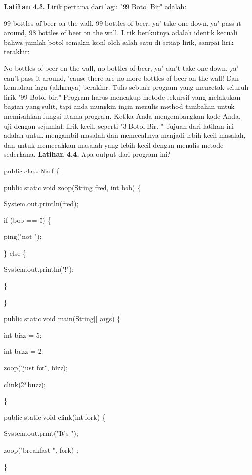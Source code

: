 \textbf{Latihan 4.3.} Lirik pertama dari lagu "99 Botol Bir" adalah:
\newline
\par
99 bottles of beer on the wall, 99 bottles of beer, ya’ take one
down, ya’ pass it around, 98 bottles of beer on the wall.
\newline
\newline
Lirik berikutnya adalah identik kecuali bahwa jumlah botol semakin kecil oleh salah satu di setiap lirik, sampai lirik terakhir:
\newline
\par
No bottles of beer on the wall, no bottles of beer, ya’ can’t take one down, ya’ can’t pass it around, ’cause there are no more
bottles of beer on the wall!
\newline
\newline
Dan kemudian lagu (akhirnya) berakhir.
\newline
\newline
Tulis sebuah program yang mencetak seluruh lirik "99 Botol bir." Program harus mencakup metode rekursif yang melakukan bagian yang sulit, tapi anda mungkin ingin menulis method tambahan untuk memisahkan fungsi utama program.
\newline
\newline
Ketika Anda mengembangkan kode Anda, uji dengan sejumlah lirik kecil, seperti "3 Botol Bir. "
\newline
\newline
Tujuan dari latihan ini adalah untuk mengambil masalah dan memecahnya menjadi lebih kecil masalah, dan untuk memecahkan masalah yang lebih kecil dengan menulis metode sederhana.
\newline
\newline
\textbf{Latihan 4.4.} Apa output dari program ini?
\newline
\par
public class Narf \{
\par
	public static void zoop(String fred, int bob) \{
	\par
		System.out.println(fred);
		\par
		if (bob == 5) \{
		\par
			ping("not ");
			\par
		\} else \{
		\par
		System.out.println("!");
		\par
	\}
	\par
\}
\newline
\par
public static void main(String[] args) \{
\par
	int bizz = 5;
	\par
	int buzz = 2;
	\par
	zoop("just for", bizz);
	\par
	clink(2*buzz);
	\par
\}
\newline
\par
public static void clink(int fork) \{
\par
	System.out.print("It's ");
	\par
	zoop("breakfast ", fork) ;
	\par
\}
\newline
\par

